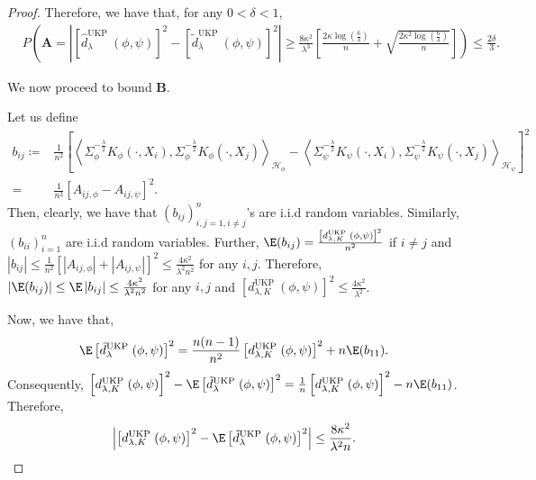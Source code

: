 \documentclass{article} %
\newcommand{\repone}{\phi}
\newcommand{\reptwo}{\psi}
\newcommand{\Hone}{\mathcal{H}_{\phi}}
\newcommand{\Htwo}{\mathcal{H}_{\psi}}
\newcommand{\inprod}[1]{\left \langle #1 \right\rangle}
\newcommand{\metricstname}{UKP }
\theoremstyle{plain}
\begin{document}
\begin{proof}
Therefore, we have that, for any $0<\delta<1$,
\[
\begin{aligned}
    &P\left(\mathbf{A}=\left|\left[\hat{d}_{\lambda}^{\text{\metricstname}}(\repone,\reptwo)\right]^{2} - \left[\tilde{d}_{\lambda}^{\text{\metricstname}}(\repone,\reptwo)\right]^{2}\right|\right.\geq \left.\frac{8\kappa^{2}}{\lambda^{3}}\left[\frac{2\kappa\log(\frac{6}{\delta})}{n} + \sqrt{\frac{2\kappa^{2}\log(\frac{6}{\delta})}{n}}\right]\right) \leq \frac{2\delta}{3}.
\end{aligned}
\]

We now proceed to bound $\mathbf{B}$.

Let us define 
\[
\begin{aligned}
    b_{ij} \coloneq& \frac{1}{n^{2}}\left[\inprod{\Sigma_{\repone}^{-\frac{\lambda}{2}}K_{\repone}(\cdot,X_{i}),\Sigma_{\repone}^{-\frac{\lambda}{2}}K_{\repone}(\cdot,X_{j})}_{\Hone}-\right.\left.\inprod{\Sigma_{\reptwo}^{-\frac{\lambda}{2}}K_{\reptwo}(\cdot,X_{i}),\Sigma_{\reptwo}^{-\frac{\lambda}{2}}K_{\reptwo}(\cdot,X_{j})}_{\Htwo}\right]^{2}\\
    =&\frac{1}{n^{2}}\left[A_{ij,\repone}-A_{ij,\reptwo}\right]^{2}.
\end{aligned}
\]
Then, clearly, we have that $\left(b_{ij}\right)_{i,j=1,i \neq j}^{n}$'s are i.i.d random variables. Similarly, $\left(b_{ii}\right)_{i=1}^{n}$ are i.i.d random variables. Further, $\E(b_{ij})=\frac{\left[d_{\lambda,K}^{\text{\metricstname}}(\repone,\reptwo)\right]^{2}}{n^{2}}$ if $i\neq j$ and $|b_{ij}|\leq \frac{1}{n^{2}}\left[|A_{ij,\repone}|+|A_{ij,\reptwo}|\right]^{2}\leq \frac{4\kappa^{2}}{\lambda^{2} n^{2}}$ for any $i,j$. Therefore, $\left|\E(b_{ij})\right|\leq \E\left|b_{ij}\right|\leq  \frac{4\kappa^{2}}{\lambda^{2} n^{2}}$ for any $i,j$ and $\left[d_{\lambda,K}^{\text{\metricstname}}(\repone,\reptwo)\right]^{2} \leq \frac{4\kappa^{2}}{\lambda^{2}}$.

Now, we have that, $$\E\left[\tilde{d}_{\lambda}^{\text{\metricstname}}(\repone,\reptwo)\right]^{2} = \frac{n(n-1)}{n^{2}}\left[d_{\lambda,K}^{\text{\metricstname}}(\repone,\reptwo)\right]^{2} + n\E(b_{11}).$$ Consequently, $\left[d_{\lambda,K}^{\text{\metricstname}}(\repone,\reptwo)\right]^{2} - \E\left[\tilde{d}_{\lambda}^{\text{\metricstname}}(\repone,\reptwo)\right]^{2} = \frac{1}{n}\left[d_{\lambda,K}^{\text{\metricstname}}(\repone,\reptwo)\right]^{2} - n\E(b_{11})$. Therefore, $$\left|\left[d_{\lambda,K}^{\text{\metricstname}}(\repone,\reptwo)\right]^{2} - \E\left[\tilde{d}_{\lambda}^{\text{\metricstname}}(\repone,\reptwo)\right]^{2}\right|\leq \frac{8\kappa^{2}}{\lambda^{2} n}.$$ 


\end{proof}
\end{document}
